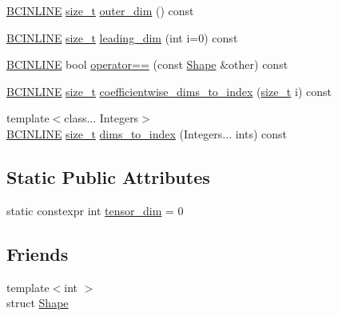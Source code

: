 \begin{DoxyCompactItemize}
\item 
\hyperlink{common_8h_a6699e8b0449da5c0fafb878e59c1d4b1}{B\+C\+I\+N\+L\+I\+NE} \hyperlink{structbc_1_1Shape_3_010_01_4_a7bf4db55cfc575f40871044048ea5c03}{size\+\_\+t} \hyperlink{structbc_1_1Shape_3_010_01_4_a18118f9b140b3b87cd58ef8701573f47}{outer\+\_\+dim} () const
\item 
\hyperlink{common_8h_a6699e8b0449da5c0fafb878e59c1d4b1}{B\+C\+I\+N\+L\+I\+NE} \hyperlink{structbc_1_1Shape_3_010_01_4_a7bf4db55cfc575f40871044048ea5c03}{size\+\_\+t} \hyperlink{structbc_1_1Shape_3_010_01_4_a5ab2afc6a77a328d1accdd436ed4ed5d}{leading\+\_\+dim} (int i=0) const
\item 
\hyperlink{common_8h_a6699e8b0449da5c0fafb878e59c1d4b1}{B\+C\+I\+N\+L\+I\+NE} bool \hyperlink{structbc_1_1Shape_3_010_01_4_adeda1d4a7ac105d365276716998e65de}{operator==} (const \hyperlink{structbc_1_1Shape}{Shape} \&other) const
\item 
\hyperlink{common_8h_a6699e8b0449da5c0fafb878e59c1d4b1}{B\+C\+I\+N\+L\+I\+NE} \hyperlink{structbc_1_1Shape_3_010_01_4_a7bf4db55cfc575f40871044048ea5c03}{size\+\_\+t} \hyperlink{structbc_1_1Shape_3_010_01_4_a3bd9f465970887d2d768c797c55af086}{coefficientwise\+\_\+dims\+\_\+to\+\_\+index} (\hyperlink{structbc_1_1Shape_3_010_01_4_a7bf4db55cfc575f40871044048ea5c03}{size\+\_\+t} i) const
\item 
{\footnotesize template$<$class... Integers$>$ }\\\hyperlink{common_8h_a6699e8b0449da5c0fafb878e59c1d4b1}{B\+C\+I\+N\+L\+I\+NE} \hyperlink{structbc_1_1Shape_3_010_01_4_a7bf4db55cfc575f40871044048ea5c03}{size\+\_\+t} \hyperlink{structbc_1_1Shape_3_010_01_4_a71aefca6058972cb28a296ec4f838ed6}{dims\+\_\+to\+\_\+index} (Integers... ints) const
\end{DoxyCompactItemize}
\subsection*{Static Public Attributes}
\begin{DoxyCompactItemize}
\item 
static constexpr int \hyperlink{structbc_1_1Shape_3_010_01_4_a51538fcebc3d3462b672ac7e5d3e77c5}{tensor\+\_\+dim} = 0
\end{DoxyCompactItemize}
\subsection*{Friends}
\begin{DoxyCompactItemize}
\item 
{\footnotesize template$<$int $>$ }\\struct \hyperlink{structbc_1_1Shape_3_010_01_4_ab0bde87b11c5c08fec2f2325317820de}{Shape}
\end{DoxyCompactItemize}


